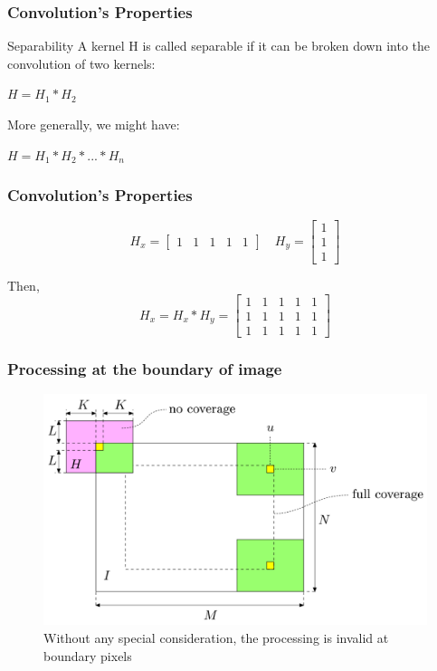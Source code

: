 \documentclass[english,11pt,table,handout]{beamer}
\begin{document}
\frame
{
	\frametitle{Convolution's Properties}
	\begin{block}{Separability}
		A kernel H is called separable if it can be broken down into the convolution of two kernels:
		
		\centering $H = H_{1} * H_{2}$
		
		\flushleft More generally, we might have:
		
		\centering $H = H_{1} * H_{2}* ... * H_{n}$
	\end{block}
}


\frame
{
	\frametitle{Convolution's Properties}
	\begin{example}
		$$
		H_{x} = 
		\begin{bmatrix}
		1 & 1 & 1 & 1 & 1
		\end{bmatrix}
		\quad
		H_{y} = 
		\begin{bmatrix}
		1 \\ 1 \\ 1
		\end{bmatrix}
		$$
		
		Then,
		$$
		H_{x}  = H_{x} * H_{y} = 
		\begin{bmatrix}
			1 & 1 & 1 & 1 & 1\\
			1 & 1 & 1 & 1 & 1\\
			1 & 1 & 1 & 1 & 1
		\end{bmatrix}
		$$
		
	\end{example}
	
}
\frame
{
	\frametitle{Processing at the boundary of image}
	
	\begin{figure}[!h]
		\includegraphics[scale=0.57]{boundary_effect.png}
		\caption{Without any special consideration, the processing is invalid at boundary pixels} 
	\end{figure}

}
\end{document}
